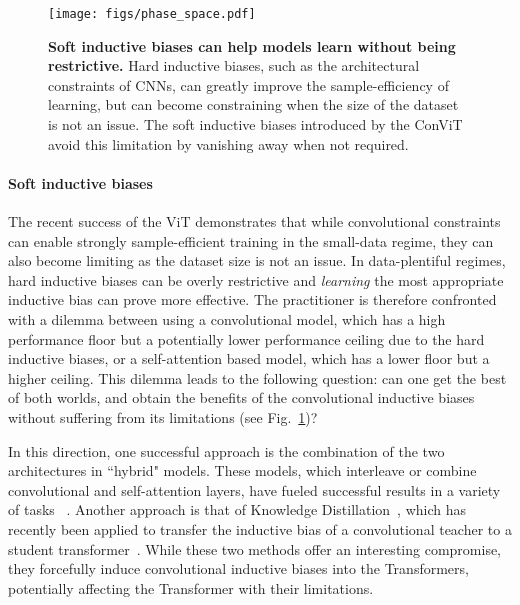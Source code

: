 \begin{figure}[t]
    \centering
    \texttt{[image: figs/phase\_space.pdf]}
    \caption{\textbf{Soft inductive biases can help models learn without being restrictive.} Hard inductive biases, such as the architectural constraints of CNNs, can greatly improve the sample-efficiency of learning, but can become constraining when the size of the dataset is not an issue. The soft inductive biases introduced by the ConViT avoid this limitation by vanishing away when not required. 
    }
    \label{fig:phase_space}
\end{figure}


\paragraph{Soft inductive biases}

The recent success of the ViT demonstrates that while convolutional constraints can enable strongly sample-efficient training in the small-data regime, they can also become limiting as the dataset size is not an issue. In data-plentiful regimes, hard inductive biases can be overly restrictive and \textit{learning} the most appropriate inductive bias can prove more effective. The practitioner is therefore confronted with a dilemma between using a convolutional model, which has a high performance floor but a potentially lower performance ceiling due to the hard inductive biases, or a self-attention based model, which has a lower floor but a higher ceiling. This dilemma leads to the following question: can one get the best of both worlds, and obtain the benefits of the convolutional inductive biases without suffering from its limitations (see Fig.~\ref{fig:phase_space})?

In this direction, one successful approach is the combination of the two architectures in ``hybrid" models. These models, which interleave or combine convolutional and self-attention layers, have fueled successful results in a variety of tasks ~\cite{carion2020end,hu2018relation,ramachandran2019stand,chen2020uniter,locatello2020object,sun2019videobert,srinivas20201bottleneck,wu_visual_2020}. Another approach is that of Knowledge Distillation~\cite{hinton2015distilling}, which has recently been applied to transfer the inductive bias of a convolutional teacher to a student transformer~\cite{touvron2020training}. While these two methods offer an interesting compromise, they forcefully induce convolutional inductive biases into the Transformers, potentially affecting the Transformer with their limitations. 

